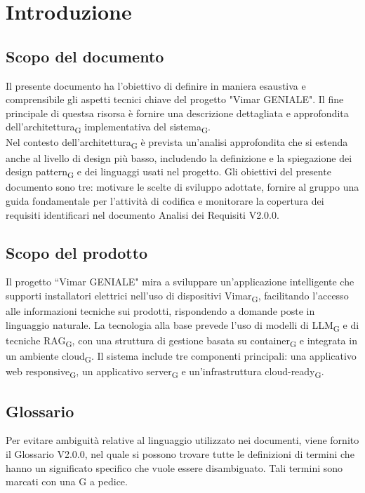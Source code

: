 \section{Introduzione}
\subsection{Scopo del documento}
Il presente documento ha l’obiettivo di definire in maniera esaustiva e comprensibile gli aspetti tecnici chiave del progetto "Vimar GENIALE". Il fine principale di questsa risorsa è fornire una descrizione dettagliata e approfondita dell'architettura\textsubscript{G} implementativa del sistema\textsubscript{G}. \\
Nel contesto dell'architettura\textsubscript{G} è prevista un'analisi approfondita che si estenda anche al livello di design più basso, includendo la definizione e la spiegazione dei design pattern\textsubscript{G} e dei linguaggi usati nel progetto.
Gli obiettivi del presente documento sono tre: motivare le scelte di sviluppo adottate, fornire al gruppo una guida fondamentale per l'attività di codifica e monitorare la copertura dei requisiti identificari nel documento Analisi dei Requisiti V2.0.0.

\subsection{Scopo del prodotto}
Il progetto ``Vimar GENIALE" mira a sviluppare un'applicazione intelligente che supporti installatori elettrici nell'uso di dispositivi Vimar\textsubscript{G}, facilitando l'accesso alle informazioni tecniche sui prodotti, rispondendo a domande poste in linguaggio naturale.
La tecnologia alla base prevede l'uso di modelli di LLM\textsubscript{G} e di tecniche RAG\textsubscript{G}, con una struttura di gestione basata su container\textsubscript{G} e integrata in un ambiente cloud\textsubscript{G}.
Il sistema include tre componenti principali: una applicativo web responsive\textsubscript{G}, un applicativo server\textsubscript{G} e un'infrastruttura cloud-ready\textsubscript{G}. 
\subsection{Glossario}
Per evitare ambiguità relative al linguaggio utilizzato nei documenti, viene fornito il Glossario V2.0.0, nel quale si possono trovare tutte le definizioni di termini che hanno un significato specifico che vuole essere disambiguato. Tali termini sono marcati con una G a pedice. 
